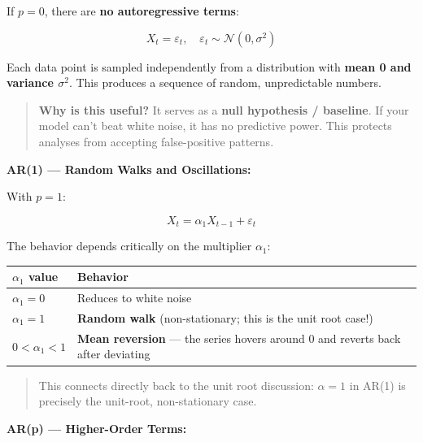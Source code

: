 \documentclass[12pt,openany]{book}
\begin{document}
If \(p = 0\), there are \textbf{no autoregressive terms}:

\begin{equation*}
    X_t = \varepsilon_t, \quad \varepsilon_t \sim \mathcal{N}(0, \sigma^2)
\end{equation*}

Each data point is sampled independently from a distribution with \textbf{mean 0 and variance \(\sigma^2\)}. This produces a sequence of random, unpredictable numbers.

\begin{quote}
\textbf{Why is this useful?} It serves as a \textbf{null hypothesis / baseline}. If your model can't beat white noise, it has no predictive power. This protects analyses from accepting false-positive patterns.\par

\end{quote}

\textbf{AR(1) --- Random Walks and Oscillations:}

With \(p=1\):

\begin{equation*}
    X_t = \alpha_1 X_{t-1} + \varepsilon_t
\end{equation*}

The behavior depends critically on the multiplier \(\alpha_1\):

\begin{center}
\begin{tabular}{|L{0.28\textwidth}|L{0.62\textwidth}|}
\hline
\(\alpha_1\) value & Behavior \\
\hline
\(\alpha_1 = 0\) & Reduces to white noise \\
\hline
\(\alpha_1 = 1\) & \textbf{Random walk} (non-stationary; this is the unit root case!) \\
\hline
\(0 < \alpha_1 < 1\) & \textbf{Mean reversion} --- the series hovers around 0 and reverts back after deviating \\
\hline
\end{tabular}
\end{center}

\begin{quote}
This connects directly back to the unit root discussion: \(\alpha = 1\) in AR(1) is precisely the unit-root, non-stationary case.\par

\end{quote}

\textbf{AR(p) --- Higher-Order Terms:}
\end{document}
